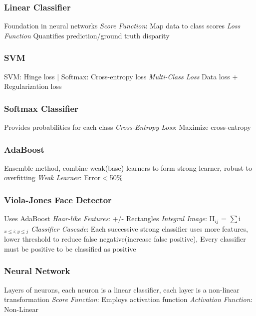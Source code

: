 \documentclass{article}
\begin{document}
\begin{multicols*}{2}
        \subsubsection*{Linear Classifier}
        Foundation in neural networks\newline
        \textit{Score Function}: Map data to class scores\newline
        \textit{Loss Function} Quantifies prediction/ground truth disparity\newline
        \subsubsection*{SVM}
        SVM: Hinge loss | Softmax: Cross-entropy loss\newline
        \textit{Multi-Class Loss} Data loss + Regularization loss\newline
        \subsubsection*{Softmax Classifier}
        Provides probabilities for each class\newline
        \textit{Cross-Entropy Loss}: Maximize cross-entropy\newline
        \subsubsection*{AdaBoost}
        Ensemble method, combine weak(base) learners to form strong learner, robust to
        overfitting\newline
        \textit{Weak Learner}: Error$<$50\%\newline
        \subsubsection*{Viola-Jones Face Detector}
        Uses AdaBoost\newline
        \textit{Haar-like Features}: +/- Rectangles\newline
        \textit{Integral Image}: II$_{ij}$ = $\sum$i$_{x\leq i;y \leq j}$ \newline
        \textit{Classifier Cascade}: Each successive strong classifier uses more features, lower
        threshold to reduce false negative(increase false positive), Every classifier must be
        positive to be classified as positive\newline
        \subsubsection*{Neural Network}
        Layers of neurons, each neuron is a linear classifier, each layer is a non-linear transformation\newline
        \textit{Score Function}: Employs activation function\newline
        \textit{Activation Function}: Non-Linear\newline

\end{multicols*}
\end{document}
